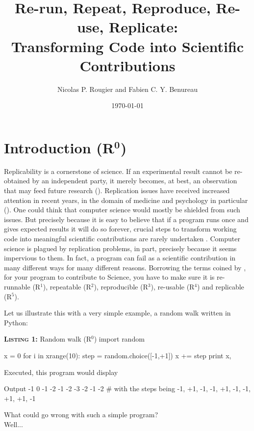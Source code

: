 \documentclass[a4paper,11pt]{article}
\title{Re-run, Repeat, Reproduce, Re-use, Replicate:\\Transforming Code into Scientific Contributions}
\author{Nicolas P. Rougier and Fabien C. Y. Benureau}
\date{\today}
\begin{document}
\maketitle
\section*{Introduction (R$^{\mathbf 0}$)}

Replicability is a cornerstone of science.  If an experimental result cannot be
re-obtained by an independent party, it merely becomes, at best, an observation
that may feed future research (\cite{Mesirov:2010,osc:2015}).  Replication
issues have received increased attention in recent years, in the domain of
medicine and psychology in particular (\cite{Iqbal:2016}). One could think that
computer science would mostly be shielded from such issues.  But precisely
because it is easy to believe that if a program runs once and gives expected
results it will do so forever, crucial steps to transform working code into
meaningful scientific contributions are rarely undertaken
\citep{Sandve:2013,Schwab:2000}.  Computer science is plagued by replication
problems, in part, precisely because it seems impervious to them.
In fact, a program can fail as a scientific contribution in many different ways
for many different reasons.  Borrowing the terms coined by
\citeauthor{Goble:2016} \citep{Goble:2016}, for your program to contribute to
Science, you have to make sure it is re-runnable (R$^1$), repeatable (R$^2$),
reproducible (R$^3$), re-usable (R$^4$) and replicable (R$^5$).

Let us illustrate this with a very simple example,
a random walk written in Python:

\begin{code}{\textbf{\textsc{Listing 1:}} Random walk (R$^0$)}
import random

x = 0
for i in xrange(10):
    step = random.choice([-1,+1])
    x += step
    print x,
\end{code}

Executed, this program would display 
\begin{code}{Output}
-1  0 -1 -2 -1 -2 -3 -2 -1 -2 # with the steps being -1, +1, -1, -1, +1, -1, -1, +1, +1, -1
\end{code}

What could go wrong with such a simple program?\\
\vfill
Well...
\vfill
\end{document}

